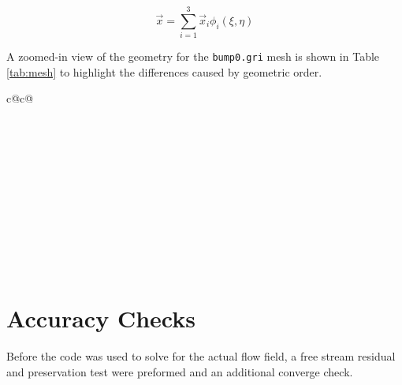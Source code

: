 \documentclass{article}
\begin{document}
	\begin{equation}
	\vec{x}=\sum_{i=1}^{3} \vec{x}_{i} \phi_{i}(\xi, \eta)
	\label{eqn:qbasis}
	\end{equation}

	A zoomed-in view of the geometry for the \texttt{bump0.gri} mesh is shown in Table \ref{tab:mesh} to highlight the differences caused by geometric order.
\begin{table}[H]
	\begin{center}
	\begin{tabular}{ c@{}c@{} }


		\hline
		\\


		\hline
		\vspace{0.1mm}\\
		\\

		\hline
		\\

		\hline
		\vspace{0.1mm}\\

		\\

		\hline
		\\

		\hline
		\vspace{0.1mm}\\

		\\
		\vspace{0.25mm}\\
	\end{tabular}
	\caption{Geometric reparation of \texttt{bump0.gri} for the each geometric representation order}
	\label{tab:mesh}
	\vspace*{-3mm}
	\end{center}
\end{table}





\section{Accuracy Checks}
Before the code was used to solve for the actual flow field, a free stream residual and preservation test were preformed and an additional converge check.
\end{document}
